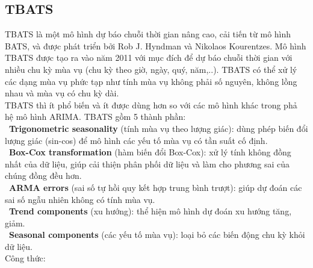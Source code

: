 \documentclass[conference]{IEEEtran}
\begin{document}
\subsection{TBATS}
TBATS là một mô hình dự báo chuỗi thời gian nâng cao, cải tiến từ mô hình BATS, và được phát triển bởi Rob J. Hyndman và Nikolaos Kourentzes. Mô hình TBATS được tạo ra vào năm 2011 với mục đích để dự báo chuỗi thời gian với nhiều chu kỳ mùa vụ (chu kỳ theo giờ, ngày, quý, năm,..). TBATS có thể xử lý các dạng mùa vụ phức tạp như tính mùa vụ không phải số nguyên, không lồng nhau và mùa vụ có chu kỳ dài.
 \\
TBATS thì ít phổ biến và ít được dùng hơn so với các mô hình khác trong phả hệ mô hình ARIMA. TBATS gồm 5 thành phần:\\
\indent\textbullet\ \textbf{Trigonometric seasonality} (tính mùa vụ theo lượng giác): dùng phép biến đổi lượng giác (sin-cos) để mô hình các yếu tố mùa vụ có tần suất cố định.
\\
\indent\textbullet\ \textbf{Box-Cox transformation} (hàm biến đổi Box-Cox): xử lý tính không đồng nhất của dữ liệu, giúp cải thiện phân phối dữ liệu và làm cho phương sai của chúng đồng đều hơn.
\\
\indent\textbullet\ \textbf{ARMA errors} (sai số tự hồi quy kết hợp trung bình trượt): giúp dự đoán các sai số ngẫu nhiên không có tính mùa vụ.\\
\indent\textbullet\ \textbf{Trend components} (xu hướng): thể hiện mô hình dự đoán xu hướng tăng, giảm.\\
\indent\textbullet\ \textbf{Seasonal components} (các yếu tố mùa vụ): loại bỏ các biến động chu kỳ khỏi dữ liệu.
\\
Công thức:\\
\end{document}
